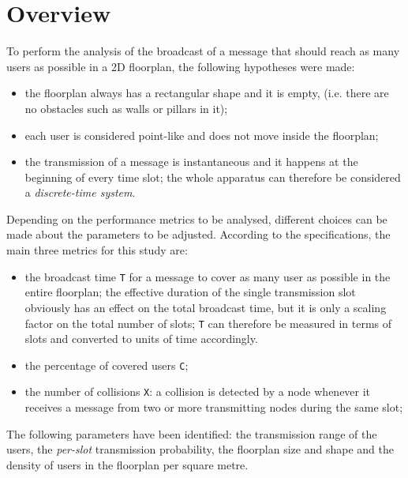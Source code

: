 %
\chapter{Overview}\label{ch:overview}
To perform the analysis of the broadcast of a message that should reach as many
users as possible in a 2D floorplan, the following hypotheses were made:
\begin{itemize}
	\item the floorplan always has a rectangular shape and it is empty, (i.e.
	there are no obstacles such as walls or pillars in it);
	\item each user is considered point-like and does not move inside the
	floorplan;
	\item the transmission of a message is instantaneous and it happens at the
	beginning of every time slot; the whole apparatus can therefore be
	considered a \textit{discrete-time system}.
\end{itemize}
Depending on the performance metrics to be analysed, different choices can be
made about the parameters to be adjusted. According to the specifications, the
main three metrics for this study are:
\begin{itemize}
	\item the broadcast time \colorbox{gray!30}{\large \texttt{T}} for a message
	to cover as many user as possible in the entire floorplan; the effective
	duration of the single transmission slot obviously has an effect
	on the total broadcast time, but it is only a scaling factor on the total
	number of slots; \texttt{T} can therefore be measured in terms of slots and
	converted to units of time accordingly.
	\item the percentage of covered users \colorbox{gray!30}{\large \texttt{C}};
	\item the number of collisions \colorbox{gray!30}{\large \texttt{X}}:
	a collision is detected by a node whenever it receives a message from two or more transmitting nodes during the same slot;
\end{itemize}
The following parameters have been identified: the transmission range of the
users, the \textit{per-slot} transmission probability, the floorplan size and shape and the density of users in the floorplan per square metre.\\
